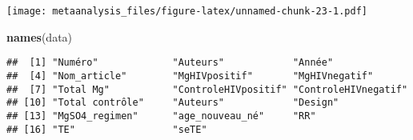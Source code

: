\documentclass[
]{article}
\newenvironment{Shaded}{\begin{snugshade}}{\end{snugshade}}
\newcommand{\FunctionTok}[1]{\textcolor[rgb]{0.13,0.29,0.53}{\textbf{#1}}}
\newcommand{\NormalTok}[1]{#1}
\begin{document}
\texttt{[image: metaanalysis\_files/figure-latex/unnamed-chunk-23-1.pdf]}

\begin{Shaded}
\begin{Highlighting}[]
\FunctionTok{names}\NormalTok{(data)}
\end{Highlighting}
\end{Shaded}

\begin{verbatim}
##  [1] "Numéro"             "Auteurs"            "Année"             
##  [4] "Nom_article"        "MgHIVpositif"       "MgHIVnegatif"      
##  [7] "Total Mg"           "ControleHIVpositif" "ControleHIVnegatif"
## [10] "Total contrôle"     "Auteurs"            "Design"            
## [13] "MgSO4_regimen"      "age_nouveau_né"     "RR"                
## [16] "TE"                 "seTE"
\end{verbatim}
\end{document}
